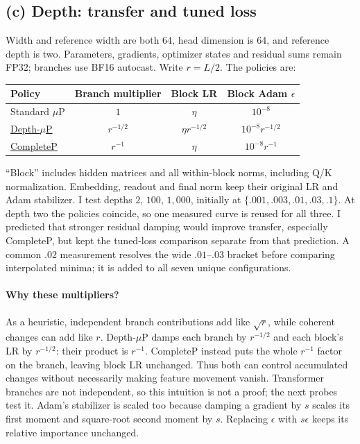 \documentclass{article}
\begin{document}
\subsection{(c) Depth: transfer and tuned loss}

Width and reference width are both 64, head dimension is 64, and reference
depth is two. Parameters, gradients, optimizer states and residual sums
remain FP32; branches use BF16 autocast. Write $r=L/2$. The policies are:
\begin{center}
\begin{tabular}{lccc}
\toprule
Policy & Branch multiplier & Block LR & Block Adam $\epsilon$ \\
\midrule
Standard $\mu$P & $1$ & $\eta$ & $10^{-8}$ \\
\href{https://arxiv.org/abs/2310.02244}{Depth-$\mu$P} & $r^{-1/2}$ & $\eta r^{-1/2}$ & $10^{-8}r^{-1/2}$ \\
\href{https://arxiv.org/abs/2505.01618}{CompleteP} & $r^{-1}$ & $\eta$ & $10^{-8}r^{-1}$ \\
\bottomrule
\end{tabular}
\end{center}
``Block'' includes hidden matrices and all within-block norms, including
Q/K normalization. Embedding, readout and final norm keep their original
LR and Adam stabilizer. I test depths $2$, $100$, $1{,}000$, initially at
$\{.001,.003,.01,.03,.1\}$. At depth two the policies coincide, so one
measured curve is reused for all three. I predicted that stronger
residual damping would improve transfer, especially CompleteP, but kept
the tuned-loss comparison separate from that prediction.
A common $.02$ measurement resolves the wide $.01$--$.03$ bracket before
comparing interpolated minima; it is added to all seven unique configurations.

\paragraph{Why these multipliers?} As a heuristic, independent branch
contributions add like $\sqrt r$, while coherent changes can add like $r$.
Depth-$\mu$P damps each branch by $r^{-1/2}$ and each block's LR by
$r^{-1/2}$: their product is $r^{-1}$. CompleteP instead puts the whole
$r^{-1}$ factor on the branch, leaving block LR unchanged. Thus both
can control accumulated changes without necessarily making feature
movement vanish. Transformer branches are not independent, so this
intuition is not a proof; the next probes test it.
Adam's stabilizer is scaled too because damping a gradient by $s$ scales
its first moment and square-root second moment by $s$. Replacing
$\epsilon$ with $s\epsilon$ keeps its relative importance unchanged.
\end{document}
